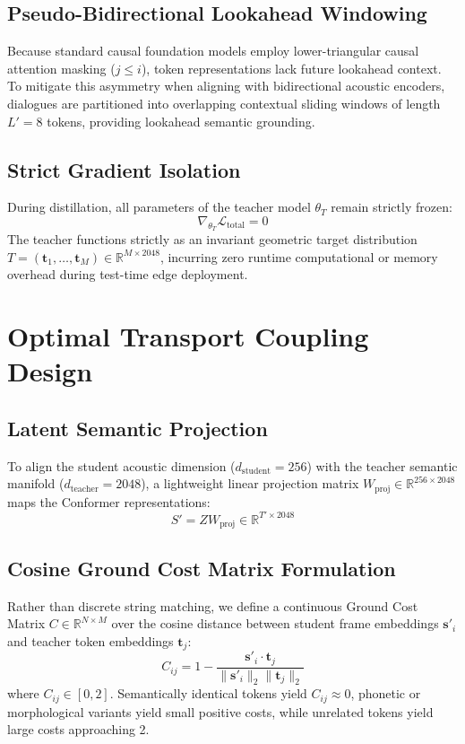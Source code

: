 \subsection{Pseudo-Bidirectional Lookahead Windowing}
Because standard causal foundation models employ lower-triangular causal attention masking ($j \le i$), token representations lack future lookahead context. To mitigate this asymmetry when aligning with bidirectional acoustic encoders, dialogues are partitioned into overlapping contextual sliding windows of length $L' = 8$ tokens, providing lookahead semantic grounding.

\subsection{Strict Gradient Isolation}
During distillation, all parameters of the teacher model $\theta_T$ remain strictly frozen:
\begin{equation}
    \nabla_{\theta_T} \mathcal{L}_{\text{total}} = 0
\end{equation}
The teacher functions strictly as an invariant geometric target distribution $T = (\mathbf{t}_1, \dots, \mathbf{t}_M) \in \mathbb{R}^{M \times 2048}$, incurring zero runtime computational or memory overhead during test-time edge deployment.

\section{Optimal Transport Coupling Design}

\subsection{Latent Semantic Projection}
To align the student acoustic dimension ($d_{\text{student}} = 256$) with the teacher semantic manifold ($d_{\text{teacher}} = 2048$), a lightweight linear projection matrix $W_{\text{proj}} \in \mathbb{R}^{256 \times 2048}$ maps the Conformer representations:
\begin{equation}
    S' = Z W_{\text{proj}} \in \mathbb{R}^{T' \times 2048}
\end{equation}

\subsection{Cosine Ground Cost Matrix Formulation}
Rather than discrete string matching, we define a continuous Ground Cost Matrix $C \in \mathbb{R}^{N \times M}$ over the cosine distance between student frame embeddings $\mathbf{s}'_i$ and teacher token embeddings $\mathbf{t}_j$:
\begin{equation}
    C_{ij} = 1 - \frac{\mathbf{s}'_i \cdot \mathbf{t}_j}{\|\mathbf{s}'_i\|_2 \|\mathbf{t}_j\|_2}
\end{equation}
where $C_{ij} \in [0, 2]$. Semantically identical tokens yield $C_{ij} \approx 0$, phonetic or morphological variants yield small positive costs, while unrelated tokens yield large costs approaching 2.

